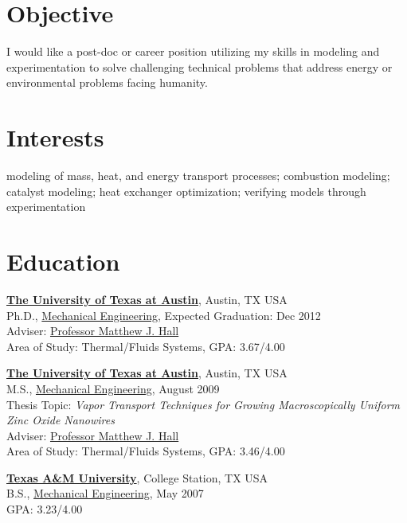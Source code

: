 \documentclass[line,margin]{res}
\begin{document}
\address{\href{mailto:calbaker@utexas.edu}{calbaker@utexas.edu}} 
\address{214-695-4636}
 
\begin{resume}
 
\section{Objective}

I would like a post-doc or career position utilizing my skills in
modeling and experimentation to solve challenging technical problems
that address energy or environmental problems facing humanity.  

\section{Interests}
%
modeling of mass, heat, and energy transport processes; combustion
modeling; catalyst modeling; heat exchanger optimization; verifying
models through experimentation
 
\section{Education}
%
\href{http://www.utexas.edu/}{\textbf{The University of Texas at
    Austin}}, Austin, TX USA \\
Ph.D., \href{http://www.me.utexas.edu/}{Mechanical Engineering},
Expected Graduation: Dec 2012 \\ 
Adviser:
\href{http://www.me.utexas.edu/directory/faculty/hall/matthew/33/}{Professor
  Matthew J. Hall} \\
Area of Study: Thermal/Fluids Systems, GPA: 3.67/4.00

\href{http://www.utexas.edu/}{\textbf{The University of Texas at
    Austin}}, Austin, TX USA \\ 
M.S., \href{http://www.me.utexas.edu/}{Mechanical Engineering}, August
2009 \\
Thesis Topic: \emph{Vapor Transport Techniques for Growing
  Macroscopically Uniform Zinc Oxide Nanowires} \\
Adviser:
\href{http://www.me.utexas.edu/directory/faculty/hall/matthew/33/}{Professor
  Matthew J. Hall} \\
Area of Study: Thermal/Fluids Systems, GPA: 3.46/4.00

\href{http://www.tamu.edu/}{\textbf{Texas A\&M University}}, College
Station, TX USA \\
B.S., \href{http://www.mengr.tamu.edu/}{Mechanical Engineering}, May
2007  \\
GPA: 3.23/4.00


\end{resume}
\end{document}

